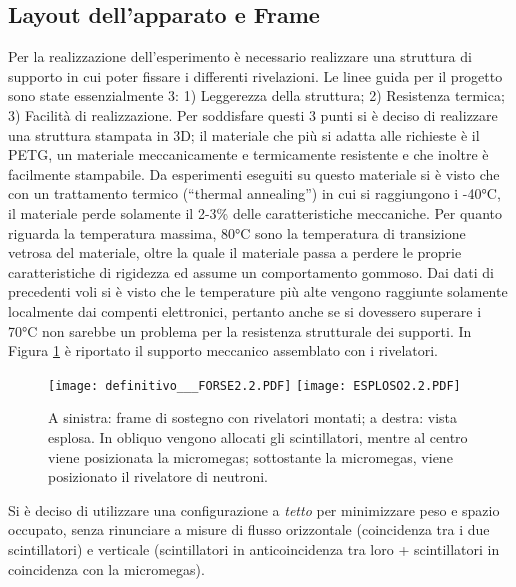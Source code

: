 \subsection{Layout dell'apparato e Frame}

Per la realizzazione dell’esperimento è necessario realizzare una struttura di supporto in cui poter fissare i differenti rivelazioni. Le linee guida per il progetto sono state essenzialmente 3: 1) Leggerezza della struttura; 2) Resistenza termica; 3) Facilità di realizzazione. Per soddisfare questi 3 punti si è deciso di realizzare una struttura stampata in 3D; il materiale che più si adatta alle richieste è il PETG, un materiale meccanicamente e termicamente resistente e che inoltre è facilmente stampabile. 
Da esperimenti eseguiti su questo materiale si è visto che con un trattamento termico (“thermal annealing”) in cui si raggiungono i -40°C, il materiale perde solamente il 2-3\% delle caratteristiche meccaniche. Per quanto riguarda la temperatura massima, 80°C sono la temperatura di transizione vetrosa del materiale, oltre la quale il materiale passa a perdere le proprie caratteristiche di rigidezza ed assume un comportamento gommoso. Dai dati di precedenti voli si è visto che le temperature più alte vengono raggiunte solamente localmente dai compenti elettronici, pertanto anche se si dovessero superare i 70°C non sarebbe un problema per la resistenza strutturale dei supporti. 
In Figura \ref{frame} è riportato il supporto meccanico assemblato con i rivelatori.
\begin{figure}
    
    \texttt{[image: definitivo\_\_\_FORSE2.2.PDF]}
    \texttt{[image: ESPLOSO2.2.PDF]}

    \caption{A sinistra: frame di sostegno con rivelatori montati; a destra: vista esplosa. In obliquo vengono allocati gli scintillatori, mentre al centro viene posizionata la micromegas; sottostante la micromegas, viene posizionato il rivelatore di neutroni.}
    \label{frame}
\end{figure}
Si è deciso di utilizzare una configurazione a \emph{tetto} per minimizzare peso e spazio occupato, senza rinunciare a misure di flusso orizzontale (coincidenza tra i due scintillatori) e verticale (scintillatori in anticoincidenza tra loro + scintillatori in coincidenza con la micromegas).
